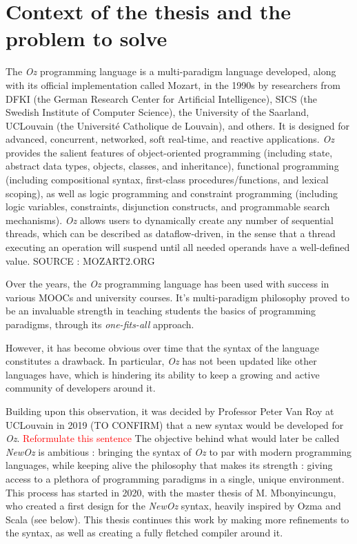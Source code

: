 
\section{Context of the thesis and the problem to solve}\label{sec:ch1-1}
The \textit{Oz} programming language is a multi-paradigm language developed, along with its official implementation called Mozart, in the 1990s by researchers from DFKI (the German Research Center for Artificial Intelligence), SICS (the Swedish Institute of Computer Science), the University of the Saarland, UCLouvain (the Université Catholique de Louvain), and others.
It is designed for advanced, concurrent, networked, soft real-time, and reactive applications.
\textit{Oz} provides the salient features of object-oriented programming (including state, abstract data types, objects, classes, and inheritance),
functional programming (including compositional syntax, first-class procedures/functions, and lexical scoping), as well as
logic programming and constraint programming (including logic variables, constraints, disjunction constructs, and programmable search mechanisms).
\textit{Oz} allows users to dynamically create any number of sequential threads, which can be described as dataflow-driven, in the sense that a thread executing an operation will suspend until all needed operands have a well-defined value.
SOURCE : MOZART2.ORG

Over the years, the \textit{Oz} programming language has been used with success in various MOOCs and university courses.
It's multi-paradigm philosophy proved to be an invaluable strength in teaching students the basics of programming paradigms, through its \textit{one-fits-all} approach.

However, it has become obvious over time that the syntax of the language constitutes a drawback.
In particular, \textit{Oz} has not been updated like other languages have, which is hindering its ability to keep a growing and active community of developers around it.

Building upon this observation, it was decided by Professor Peter Van Roy at UCLouvain in 2019 (TO CONFIRM) that a new syntax would be developed for \textit{Oz}. \textcolor{red}{Reformulate this sentence}
The objective behind what would later be called \textit{NewOz} is ambitious : bringing the syntax of \textit{Oz} to par with modern programming languages, while keeping alive the philosophy that makes its strength : giving access to a plethora of programming paradigms in a single, unique environment.
This process has started in 2020, with the master thesis of M. Mbonyincungu\cite{jpthesis}, who created a first design for the \textit{NewOz} syntax, heavily inspired by Ozma and Scala (see below).
This thesis continues this work by making more refinements to the syntax, as well as creating a fully fletched compiler around it.

